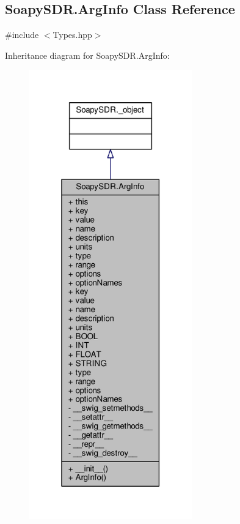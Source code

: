 \subsection{Soapy\+S\+D\+R.\+Arg\+Info Class Reference}
\label{classSoapySDR_1_1ArgInfo}


{\ttfamily \#include $<$Types.\+hpp$>$}



Inheritance diagram for Soapy\+S\+D\+R.\+Arg\+Info\+:
\nopagebreak
\begin{figure}[H]
\begin{center}
\leavevmode
\includegraphics[height=550pt]{d7/d5a/classSoapySDR_1_1ArgInfo__inherit__graph}
\end{center}
\end{figure}


